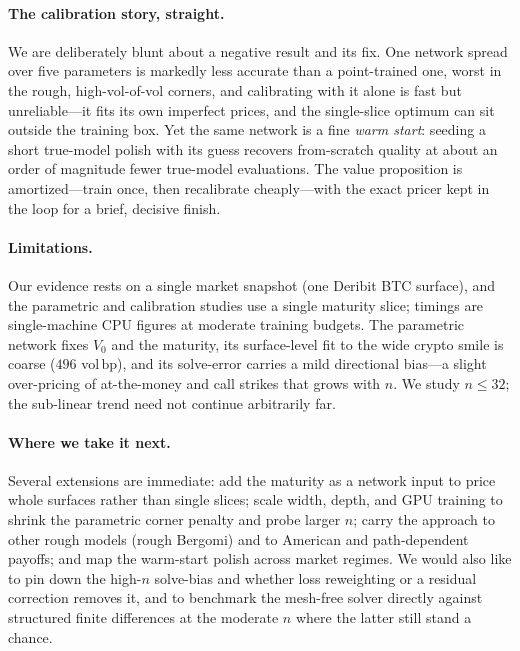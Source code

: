 \documentclass[11pt]{article}
\newcommand{\bp}{\ensuremath{\,\mathrm{bp}}}
\begin{document}
\paragraph{The calibration story, straight.}
We are deliberately blunt about a negative result and its fix. One network spread
over five parameters is markedly less accurate than a point-trained one, worst in
the rough, high-vol-of-vol corners, and calibrating with it alone is fast but
unreliable---it fits its own imperfect prices, and the single-slice optimum can
sit outside the training box. Yet the same network is a fine \emph{warm start}:
seeding a short true-model polish with its guess recovers from-scratch quality at
about an order of magnitude fewer true-model evaluations. The value proposition is
amortized---train once, then recalibrate cheaply---with the exact pricer kept in
the loop for a brief, decisive finish.

\paragraph{Limitations.}
Our evidence rests on a single market snapshot (one Deribit BTC surface), and the
parametric and calibration studies use a single maturity slice; timings are
single-machine CPU figures at moderate training budgets. The parametric network
fixes $V_0$ and the maturity, its surface-level fit to the wide crypto smile is
coarse ($496$ vol\bp), and its solve-error carries a mild directional bias---a
slight over-pricing of at-the-money and call strikes that grows with $n$. We study
$n\le32$; the sub-linear trend need not continue arbitrarily far.

\paragraph{Where we take it next.}
Several extensions are immediate: add the maturity as a network input to price
whole surfaces rather than single slices; scale width, depth, and GPU training to
shrink the parametric corner penalty and probe larger $n$; carry the approach to
other rough models (rough Bergomi) and to American and path-dependent payoffs; and
map the warm-start polish across market regimes. We would also like to pin down
the high-$n$ solve-bias and whether loss reweighting or a residual correction
removes it, and to benchmark the mesh-free solver directly against structured
finite differences at the moderate $n$ where the latter still stand a chance.



\end{document}
